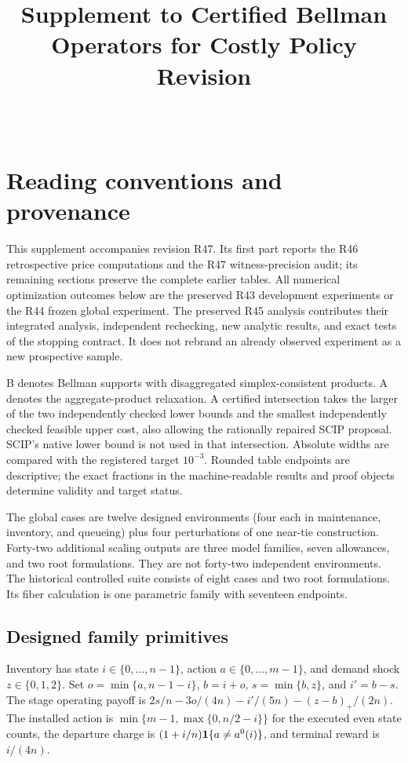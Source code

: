 
\begin{frontmatter}\title{Supplement to Certified Bellman Operators for Costly Policy Revision}\begin{aug}\author[id=au1,addressref={add1}]{~}\address[id=add1]{}\end{aug}\end{frontmatter}
\section{Reading conventions and provenance}
This supplement accompanies revision R47. Its first part reports the R46 retrospective price computations and the R47 witness-precision audit; its remaining sections preserve the complete earlier tables. All numerical optimization outcomes below are the preserved R43 development experiments or the R44 frozen global experiment. The preserved R45 analysis contributes their integrated analysis, independent rechecking, new analytic results, and exact tests of the stopping contract. It does not rebrand an already observed experiment as a new prospective sample.

B denotes Bellman supports with disaggregated simplex-consistent products. A denotes the aggregate-product relaxation. A certified intersection takes the larger of the two independently checked lower bounds and the smallest independently checked feasible upper cost, also allowing the rationally repaired SCIP proposal. SCIP's native lower bound is not used in that intersection. Absolute widths are compared with the registered target $10^{-3}$. Rounded table endpoints are descriptive; the exact fractions in the machine-readable results and proof objects determine validity and target status.

The global cases are twelve designed environments (four each in maintenance, inventory, and queueing) plus four perturbations of one near-tie construction. Forty-two additional scaling outputs are three model families, seven allowances, and two root formulations. They are not forty-two independent environments. The historical controlled suite consists of eight cases and two root formulations. Its fiber calculation is one parametric family with seventeen endpoints.


\subsection{Designed family primitives}
Inventory has state $i\in\{0,\ldots,n-1\}$, action $a\in\{0,\ldots,m-1\}$, and demand shock $z\in\{0,1,2\}$. Set $o=\min\{a,n-1-i\}$, $b=i+o$, $s=\min\{b,z\}$, and $i'=b-s$. The stage operating payoff is $2s/n-3o/(4n)-i'/(5n)-(z-b)_+/(2n)$. The installed action is $\min\{m-1,\max\{0,n/2-i\}\}$ for the executed even state counts, the departure charge is $(1+i/n)\mathbf 1\{a\ne a^0(i)\}$, and terminal reward is $i/(4n)$.

